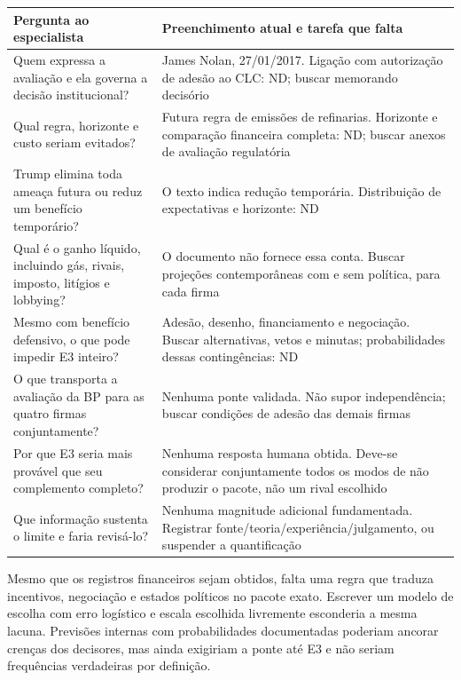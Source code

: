 \documentclass[
  brazilian,
  11pt,
  a4paper,
]{article}
\begin{document}
\begin{longtable}[]{@{}
  >{\raggedright\arraybackslash}p{}
  >{\raggedright\arraybackslash}p{}@{}}
\toprule\noalign{}
\begin{minipage}[b]{\linewidth}\raggedright
Pergunta ao especialista
\end{minipage} & \begin{minipage}[b]{\linewidth}\raggedright
Preenchimento atual e tarefa que falta
\end{minipage} \\
\midrule\noalign{}
\endhead
\bottomrule\noalign{}
\endlastfoot
Quem expressa a avaliação e ela governa a decisão institucional? & James
Nolan, 27/01/2017. Ligação com autorização de adesão ao CLC: ND; buscar
memorando decisório \\
Qual regra, horizonte e custo seriam evitados? & Futura regra de
emissões de refinarias. Horizonte e comparação financeira completa: ND;
buscar anexos de avaliação regulatória \\
Trump elimina toda ameaça futura ou reduz um benefício temporário? & O
texto indica redução temporária. Distribuição de expectativas e
horizonte: ND \\
Qual é o ganho líquido, incluindo gás, rivais, imposto, litígios e
lobbying? & O documento não fornece essa conta. Buscar projeções
contemporâneas com e sem política, para cada firma \\
Mesmo com benefício defensivo, o que pode impedir E3 inteiro? & Adesão,
desenho, financiamento e negociação. Buscar alternativas, vetos e
minutas; probabilidades dessas contingências: ND \\
O que transporta a avaliação da BP para as quatro firmas conjuntamente?
& Nenhuma ponte validada. Não supor independência; buscar condições de
adesão das demais firmas \\
Por que E3 seria mais provável que seu complemento completo? & Nenhuma
resposta humana obtida. Deve-se considerar conjuntamente todos os modos
de não produzir o pacote, não um rival escolhido \\
Que informação sustenta o limite e faria revisá-lo? & Nenhuma magnitude
adicional fundamentada. Registrar fonte/teoria/experiência/julgamento,
ou suspender a quantificação \\
\end{longtable}

Mesmo que os registros financeiros sejam obtidos, falta uma regra que
traduza incentivos, negociação e estados políticos no pacote exato.
Escrever um modelo de escolha com erro logístico e escala escolhida
livremente esconderia a mesma lacuna. Previsões internas com
probabilidades documentadas poderiam ancorar crenças dos decisores, mas
ainda exigiriam a ponte até E3 e não seriam frequências verdadeiras por
definição.
\end{document}
